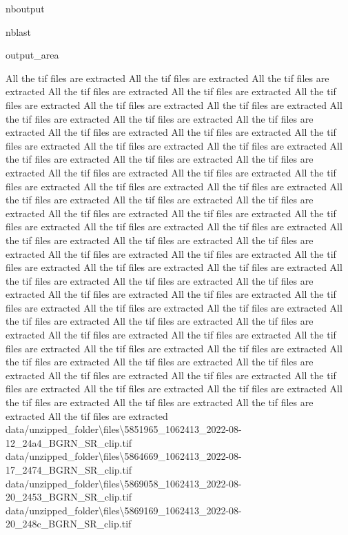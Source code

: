 \documentclass[letterpaper,10pt]{sphinxmanual}
\begin{document}
\begin{sphinxuseclass}{nboutput}
\begin{sphinxuseclass}{nblast}
{\begin{sphinxuseclass}{output_area}
\begin{sphinxuseclass}{}
\begin{sphinxVerbatim}[commandchars=\\\{\}]
All the tif files are extracted
All the tif files are extracted
All the tif files are extracted
All the tif files are extracted
All the tif files are extracted
All the tif files are extracted
All the tif files are extracted
All the tif files are extracted
All the tif files are extracted
All the tif files are extracted
All the tif files are extracted
All the tif files are extracted
All the tif files are extracted
All the tif files are extracted
All the tif files are extracted
All the tif files are extracted
All the tif files are extracted
All the tif files are extracted
All the tif files are extracted
All the tif files are extracted
All the tif files are extracted
All the tif files are extracted
All the tif files are extracted
All the tif files are extracted
All the tif files are extracted
All the tif files are extracted
All the tif files are extracted
All the tif files are extracted
All the tif files are extracted
All the tif files are extracted
All the tif files are extracted
All the tif files are extracted
All the tif files are extracted
All the tif files are extracted
All the tif files are extracted
All the tif files are extracted
All the tif files are extracted
All the tif files are extracted
All the tif files are extracted
All the tif files are extracted
All the tif files are extracted
All the tif files are extracted
All the tif files are extracted
All the tif files are extracted
All the tif files are extracted
All the tif files are extracted
All the tif files are extracted
All the tif files are extracted
All the tif files are extracted
All the tif files are extracted
All the tif files are extracted
All the tif files are extracted
All the tif files are extracted
All the tif files are extracted
All the tif files are extracted
All the tif files are extracted
All the tif files are extracted
All the tif files are extracted
All the tif files are extracted
All the tif files are extracted
All the tif files are extracted
All the tif files are extracted
All the tif files are extracted
All the tif files are extracted
All the tif files are extracted
All the tif files are extracted
All the tif files are extracted
All the tif files are extracted
data/unzipped\_folder\textbackslash{}files\textbackslash{}5851965\_1062413\_2022-08-12\_24a4\_BGRN\_SR\_clip.tif
data/unzipped\_folder\textbackslash{}files\textbackslash{}5864669\_1062413\_2022-08-17\_2474\_BGRN\_SR\_clip.tif
data/unzipped\_folder\textbackslash{}files\textbackslash{}5869058\_1062413\_2022-08-20\_2453\_BGRN\_SR\_clip.tif
data/unzipped\_folder\textbackslash{}files\textbackslash{}5869169\_1062413\_2022-08-20\_248c\_BGRN\_SR\_clip.tif

\end{sphinxVerbatim}
\end{sphinxuseclass}
\end{sphinxuseclass}}
\end{sphinxuseclass}
\end{sphinxuseclass}
\end{document}
